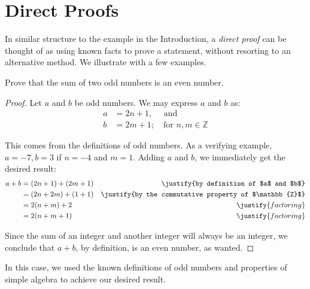 \documentclass[../proofs.tex]{subfiles}
\begin{document}
\chapter{Direct Proofs}
  In similar structure to the example in the Introduction, a \emph{direct proof} can be
  thought of as using known facts to prove a statement, without resorting to an
  alternative method. We illustrate with a few examples. \\

\begin{expl}
  Prove that the sum of two odd numbers is an even number.

\begin{proof}
Let $a$ and $b$ be odd numbers. We may express $a$ and $b$ as:
\begin{align*}
  a &= 2n + 1, \quad \text{ and}   \\
  b &= 2m + 1; \quad \text{for } n,m \in \mathbb{Z}
\end{align*}

This comes from the definitions of odd numbers. As a verifying example,
$a = -7, b = 3$ if $n = -4$ and $m = 1$. Adding $a$ and $b$, we immediately get
the desired result:
\begin{align*}
  a + b &= (2n + 1) + (2m + 1) 	& \justify{by definition of $a$ and $b$} \\
       &= (2n + 2m) + (1 + 1) 	& \justify{by the commutative property of $\mathbb{Z}$} \\
       &= 2(n+m) + 2			& \justify{factoring} \\
       &= 2(n+m+1)				& \justify{factoring}
\end{align*}

Since the sum of an integer and another integer will always be an integer, we conclude that $a+b$, by definition, is an even number, as wanted.

\end{proof}

\end{expl}

In this case, we used the known definitions of odd numbers and properties of
simple algebra to achieve our desired result.     
\end{document}
